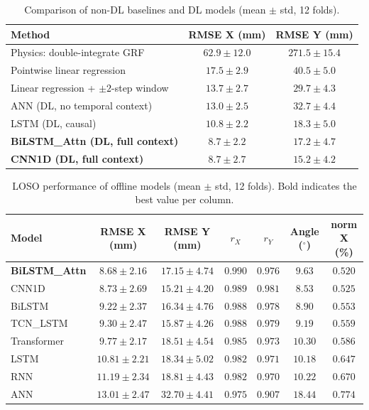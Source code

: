 \documentclass[preprint,12pt]{elsarticle}
\begin{document}
\begin{table}[H]
\centering
\caption{Comparison of non-DL baselines and DL models (mean $\pm$ std, 12 folds).}
\label{tab:baselines}
\begin{tabular}{lcc}
\toprule
Method & RMSE X (mm) & RMSE Y (mm) \\
\midrule
Physics: double-integrate GRF   & $62.9 \pm 12.0$ & $271.5 \pm 15.4$ \\
Pointwise linear regression     & $17.5 \pm 2.9$  & $40.5 \pm 5.0$   \\
Linear regression + $\pm 2$-step window & $13.7 \pm 2.7$ & $29.7 \pm 4.3$ \\
ANN (DL, no temporal context)   & $13.0 \pm 2.5$  & $32.7 \pm 4.4$   \\
LSTM (DL, causal)               & $10.8 \pm 2.2$  & $18.3 \pm 5.0$   \\
\textbf{BiLSTM\_Attn (DL, full context)} & $\mathbf{8.7 \pm 2.2}$ & $17.2 \pm 4.7$ \\
\textbf{CNN1D (DL, full context)}        & $8.7 \pm 2.7$ & $\mathbf{15.2 \pm 4.2}$ \\
\bottomrule
\end{tabular}
\end{table}

\begin{table}[H]
\centering
\caption{LOSO performance of offline models (mean $\pm$ std, 12 folds).
         Bold indicates the best value per column.}
\label{tab:offline}
\begin{tabular}{lcccccc}
\toprule
Model & RMSE X (mm) & RMSE Y (mm) & $r_X$ & $r_Y$ & Angle ($^\circ$) & norm X (\%) \\
\midrule
\textbf{BiLSTM\_Attn}
      & $\mathbf{8.68 \pm 2.16}$ & $17.15 \pm 4.74$
      & $\mathbf{0.990}$ & $0.976$ & $9.63$ & $\mathbf{0.520}$ \\
CNN1D & $8.73 \pm 2.69$ & $\mathbf{15.21 \pm 4.20}$
      & $0.989$ & $\mathbf{0.981}$ & $\mathbf{8.53}$ & $0.525$ \\
BiLSTM & $9.22 \pm 2.37$ & $16.34 \pm 4.76$
      & $0.988$ & $0.978$ & $8.90$ & $0.553$ \\
TCN\_LSTM
      & $9.30 \pm 2.47$ & $15.87 \pm 4.26$
      & $0.988$ & $0.979$ & $9.19$ & $0.559$ \\
Transformer & $9.77 \pm 2.17$ & $18.51 \pm 4.54$
      & $0.985$ & $0.973$ & $10.30$ & $0.586$ \\
LSTM  & $10.81 \pm 2.21$ & $18.34 \pm 5.02$
      & $0.982$ & $0.971$ & $10.18$ & $0.647$ \\
RNN   & $11.19 \pm 2.34$ & $18.81 \pm 4.43$
      & $0.982$ & $0.970$ & $10.22$ & $0.670$ \\
ANN   & $13.01 \pm 2.47$ & $32.70 \pm 4.41$
      & $0.975$ & $0.907$ & $18.44$ & $0.774$ \\
\bottomrule
\end{tabular}
\end{table}
\end{document}
